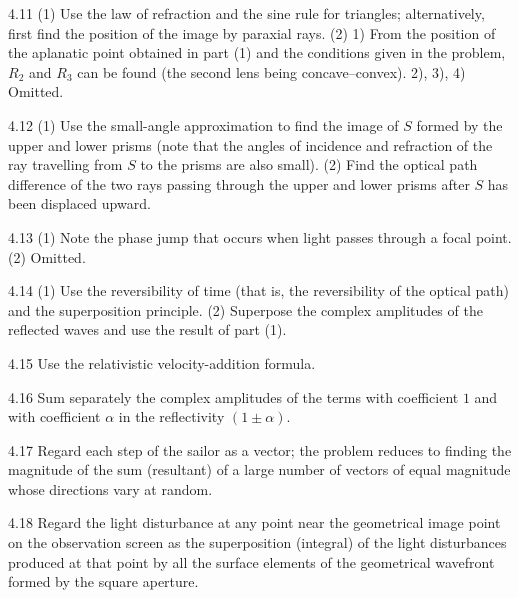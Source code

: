 \begin{hint}{4.11}
(1) Use the law of refraction and the sine rule for triangles; alternatively, first find the position of the image by paraxial rays. (2) 1) From the position of the aplanatic point obtained in part (1) and the conditions given in the problem, $R_2$ and $R_3$ can be found (the second lens being concave--convex). 2), 3), 4) Omitted.
\end{hint}

\begin{hint}{4.12}
(1) Use the small-angle approximation to find the image of $S$ formed by the upper and lower prisms (note that the angles of incidence and refraction of the ray travelling from $S$ to the prisms are also small). (2) Find the optical path difference of the two rays passing through the upper and lower prisms after $S$ has been displaced upward.
\end{hint}

\begin{hint}{4.13}
(1) Note the phase jump that occurs when light passes through a focal point. (2) Omitted.
\end{hint}

\begin{hint}{4.14}
(1) Use the reversibility of time (that is, the reversibility of the optical path) and the superposition principle. (2) Superpose the complex amplitudes of the reflected waves and use the result of part (1).
\end{hint}

\begin{hint}{4.15}
Use the relativistic velocity-addition formula.
\end{hint}

\begin{hint}{4.16}
Sum separately the complex amplitudes of the terms with coefficient $1$ and with coefficient $\alpha$ in the reflectivity $(1\pm\alpha)$.
\end{hint}

\begin{hint}{4.17}
Regard each step of the sailor as a vector; the problem reduces to finding the magnitude of the sum (resultant) of a large number of vectors of equal magnitude whose directions vary at random.
\end{hint}

\begin{hint}{4.18}
Regard the light disturbance at any point near the geometrical image point on the observation screen as the superposition (integral) of the light disturbances produced at that point by all the surface elements of the geometrical wavefront formed by the square aperture.
\end{hint}

